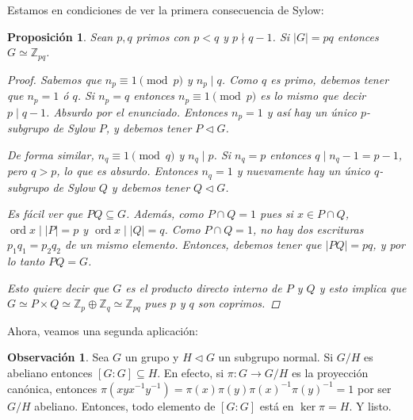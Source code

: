 \documentclass[12pt]{book}
\newtheorem{prop}[teo]{Proposición}
\theoremstyle{definition}
\newtheorem{obs}[teo]{Observación}
\newcommand{\ZZ}{\mathbb{Z}}      %
\DeclareMathOperator{\ord}{ord}
\begin{document}
Estamos en condiciones de ver la primera consecuencia de Sylow:

\begin{prop}
Sean $p,q$ primos con $p<q$ y $p\nmid q-1$. Si $|G|=pq$ entonces $G\simeq \ZZ_{pq}$.
\begin{proof}
Sabemos que $n_p\equiv 1\pmod{p}$ y $n_p\mid q$. Como $q$ es primo, debemos tener que $n_p = 1$ ó $q$. Si $n_p=q$ entonces $n_p \equiv 1 \pmod{p}$ es lo mismo que decir $p\mid q-1$. Absurdo por el enunciado. Entonces $n_p=1$ y así hay un único $p$-subgrupo de Sylow $P$, y debemos tener $P\triangleleft G$.

De forma similar, $n_q\equiv 1\pmod{q}$ y $n_q\mid p$. Si $n_q = p$ entonces $q\mid n_q - 1 = p-1$, pero $q>p$, lo que es absurdo. Entonces $n_q=1$ y nuevamente hay un único $q$-subgrupo de Sylow $Q$ y debemos tener $Q\triangleleft G$.

Es fácil ver que $PQ\subseteq G$. Además, como $P\cap Q=1$ pues si $x\in P\cap Q$, $\ord x \mid |P|=p$ y $\ord x \mid |Q|=q$. Como $P\cap Q=1$, no hay dos escrituras $p_1q_1 = p_2q_2$ de un mismo elemento. Entonces, debemos tener que $|PQ| = pq$, y por lo tanto $PQ=G$.

Esto quiere decir que $G$ es el producto directo interno de $P$ y $Q$ y esto implica que $G\simeq P\times Q \simeq \ZZ_p\oplus \ZZ_q \simeq \ZZ_{pq}$ pues $p$ y $q$ son coprimos.

\end{proof}
\end{prop}
Ahora, veamos una segunda aplicación:
\begin{obs}
Sea $G$ un grupo y $H\triangleleft G$ un subgrupo normal. Si $G/H$ es abeliano entonces $[G:G]\subseteq H$. En efecto, si $\pi:G\to G/H$ es la proyección canónica, entonces $\pi (xyx^{-1}y^{-1}) = \pi (x)\pi(y)\pi(x)^{-1}\pi(y)^{-1} = 1$ por ser $G/H$ abeliano. Entonces, todo elemento de $[G:G]$ está en $\ker \pi = H$. Y listo.
\end{obs}
\end{document}
